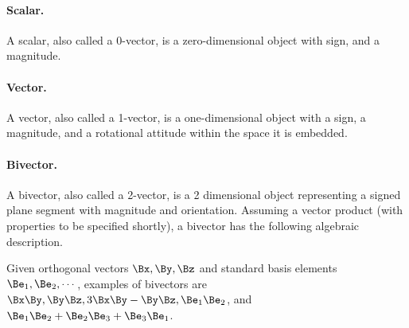 \paragraph{Scalar.}
A scalar, also called a 0-vector, is a zero-dimensional object with sign, and a magnitude.

\paragraph{Vector.}
A vector, also called a 1-vector, is a one-dimensional object with a sign, a magnitude, and a rotational attitude within the space it is embedded.

\paragraph{Bivector.}

A bivector, also called a 2-vector, is a 2 dimensional object representing a signed plane segment with magnitude and orientation.
Assuming a vector product (with properties to be specified shortly), a bivector has the following algebraic description.

Given orthogonal vectors \( \Bx, \By, \Bz \) and
standard basis elements \( \Be_1, \Be_2, \cdots \), examples of bivectors are
\( \Bx \By, \By \Bz, 3 \Bx \By - \By \Bz, \Be_1 \Be_2\), and \( \Be_1 \Be_2 + \Be_2 \Be_3 + \Be_3 \Be_1 \).

